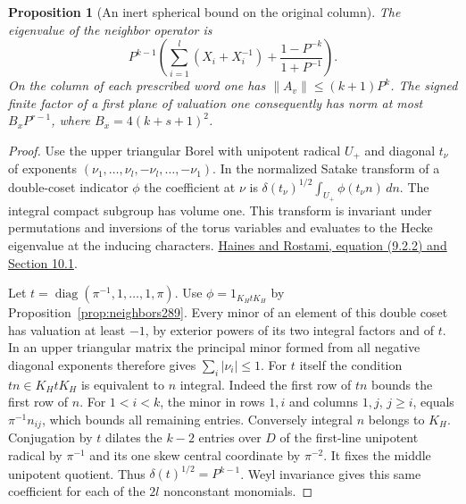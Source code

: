 \documentclass[a4paper,11pt]{article}
\newtheorem{proposition}{Proposition}[section]
\theoremstyle{definition}
\theoremstyle{remark}
\numberwithin{equation}{section}
\begin{document}
\begin{proposition}[An inert spherical bound on the original column]\leavevmode
\label{prop:sphere289}
The eigenvalue of the neighbor operator is
\[
  P^{k-1}\left(\sum_{i=1}^l(X_i+X_i^{-1})
                    +\frac{1-P^{-k}}{1+P^{-1}}\right).
\]
On the column of each prescribed word one has
\(\|A_v\|\le(k+1)P^k\). The signed finite factor of a first
plane of valuation one consequently has norm at most
\(B_xP^{r-1}\), where \(B_x=4(k+s+1)^2\).
\end{proposition}
\begin{proof}
Use the upper triangular Borel with unipotent radical \(U_+\)
and diagonal \(t_\nu\) of exponents
\((\nu_1,\ldots,\nu_l,-\nu_l,\ldots,-\nu_1)\).
In the normalized Satake transform of a double-coset indicator
\(\phi\) the coefficient at \(\nu\) is
\(\delta(t_\nu)^{1/2}\int_{U_+}\phi(t_\nu n)\,dn\).
The integral compact subgroup has volume one. This transform
is invariant under permutations and inversions of the torus
variables and evaluates to the Hecke eigenvalue at the
inducing characters.
\href{https://math.umd.edu/~tjh/satake24.pdf}{Haines and
Rostami, equation (9.2.2) and Section 10.1}.

Let \(t=\operatorname{diag}(\pi^{-1},1,\ldots,1,\pi)\).
Use \(\phi=1_{K_HtK_H}\) by Proposition~\ref{prop:neighbors289}.
Every minor of an element of this double coset has valuation
at least \(-1\), by exterior powers of its two integral factors
and of \(t\). In an upper triangular matrix the principal minor
formed from all negative diagonal exponents therefore gives
\(\sum_i|\nu_i|\le1\). For \(t\) itself the condition
\(tn\in K_HtK_H\) is equivalent to \(n\) integral. Indeed
the first row of \(tn\) bounds the first row of \(n\).
For \(1<i<k\), the minor in rows \(1,i\) and columns \(1,j\),
\(j\ge i\), equals \(\pi^{-1}n_{ij}\), which bounds all
remaining entries. Conversely integral \(n\) belongs to \(K_H\).
Conjugation by \(t\) dilates the \(k-2\) entries over \(D\)
of the first-line unipotent radical by \(\pi^{-1}\) and its
one skew central coordinate by \(\pi^{-2}\). It fixes the
middle unipotent quotient. Thus \(\delta(t)^{1/2}=P^{k-1}\).
Weyl invariance gives this same coefficient for each of the
\(2l\) nonconstant monomials.


\end{proof}
\end{document}
